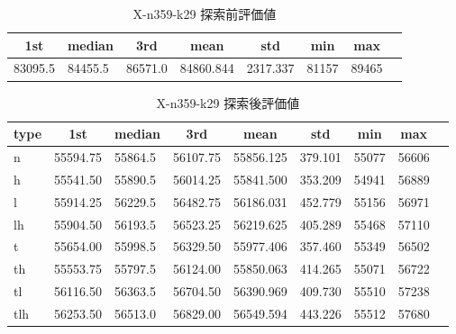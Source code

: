 \begin{table}[htbp]
    \caption{X-n359-k29 探索前評価値}
    \begin{tabular}{|l|l|l|l|l|l|l|l|}\hline
    \multicolumn{1}{|c|}{\textbf{1st}}
    &\multicolumn{1}{c|}{\textbf{median}}
    &\multicolumn{1}{c|}{\textbf{3rd}}
    &\multicolumn{1}{c|}{\textbf{mean}}
    &\multicolumn{1}{c|}{\textbf{std}}
    &\multicolumn{1}{c|}{\textbf{min}}
    &\multicolumn{1}{c|}{\textbf{max}}\\\hline
	83095.5 & 84455.5 & 86571.0 & 84860.844 & 2317.337 & 81157 & 89465\\\hline
	\end{tabular}
\end{table}
\begin{table}[htbp]
    \caption{X-n359-k29 探索後評価値}
    \begin{tabular}{|l|l|l|l|l|l|l|l|l|}\hline
    \multicolumn{1}{|c|}{\textbf{type}}
    &\multicolumn{1}{|c|}{\textbf{1st}}
    &\multicolumn{1}{c|}{\textbf{median}}
    &\multicolumn{1}{c|}{\textbf{3rd}}
    &\multicolumn{1}{c|}{\textbf{mean}}
    &\multicolumn{1}{c|}{\textbf{std}}
    &\multicolumn{1}{c|}{\textbf{min}}
    &\multicolumn{1}{c|}{\textbf{max}}\\\hline
	n & 55594.75 & 55864.5 & 56107.75 & 55856.125 & 379.101 & 55077 & 56606\\\hline
	h & 55541.50 & 55890.5 & 56014.25 & 55841.500 & 353.209 & 54941 & 56889\\\hline
	l & 55914.25 & 56229.5 & 56482.75 & 56186.031 & 452.779 & 55156 & 56971\\\hline
	lh & 55904.50 & 56193.5 & 56523.25 & 56219.625 & 405.289 & 55468 & 57110\\\hline
	t & 55654.00 & 55998.5 & 56329.50 & 55977.406 & 357.460 & 55349 & 56502\\\hline
	th & 55553.75 & 55797.5 & 56124.00 & 55850.063 & 414.265 & 55071 & 56722\\\hline
	tl & 56116.50 & 56363.5 & 56704.50 & 56390.969 & 409.730 & 55510 & 57238\\\hline
	tlh & 56253.50 & 56513.0 & 56829.00 & 56549.594 & 443.226 & 55512 & 57680\\\hline
	\end{tabular}
\end{table}
